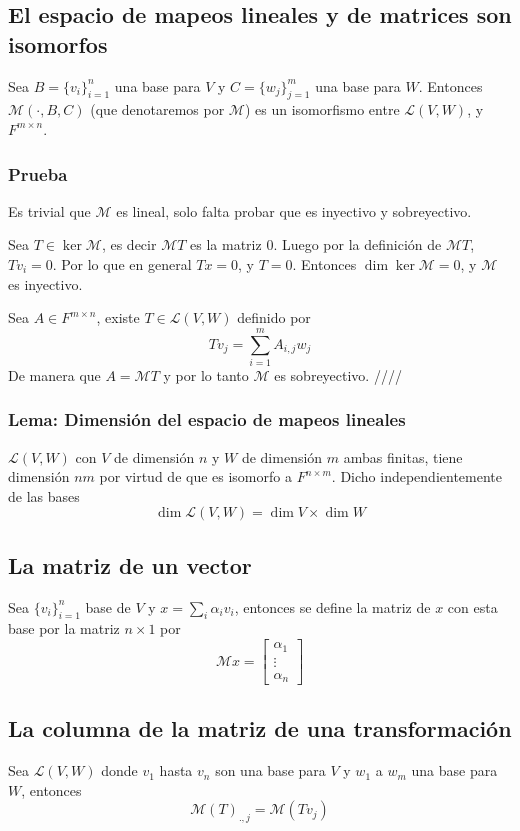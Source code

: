\documentclass{article}
\begin{document}
\subsection{El espacio de mapeos lineales y de matrices son isomorfos}
Sea $B=\{v_i\}_{i=1}^n$ una base para $V$ y $C=\{w_j\}_{j=1}^m$ una base
para $W$. Entonces $\mathcal{M}(\cdot, B, C)$ (que denotaremos por 
$\mathcal{M}$) es un isomorfismo
entre $\mathcal{L}(V,W)$, y $F^{m\times n}$.
\newcommand{\M}{\mathcal{M}}
\subsubsection*{Prueba}
Es trivial que $\M$ es lineal, solo falta probar que es inyectivo y 
sobreyectivo.

Sea $T\in\ker\M$, es decir $\M T$ es la matriz $0$. Luego por la
definición de $\M T$, $Tv_i = 0$. Por lo que en general $Tx=0$,
y $T=0$. Entonces $\dim\ker\M = 0$, y $\M$ es inyectivo.

Sea $A\in F^{m\times n}$, existe $T\in\mathcal{L}(V,W)$ definido
por $$Tv_j = \sum^m_{i=1}A_{i,j} w_j$$
De manera que $A=\M T$ y por lo tanto $\M$ es sobreyectivo.
\hfill ////

\subsubsection{Lema: Dimensión del espacio de mapeos lineales}
$\mathcal{L}(V,W)$ con $V$ de dimensión $n$ y $W$ de dimensión $m$
ambas finitas, tiene dimensión $nm$ por virtud de que es isomorfo a
$F^{n\times m}$. Dicho independientemente de las bases
$$\dim \mathcal{L}(V,W) = \dim V \times \dim W$$

\subsection{La matriz de un vector}
Sea $\{v_i\}_{i=1}^n$ base de $V$ y $x=\sum_i\alpha_i v_i$, 
entonces se define la matriz de $x$ con esta base por la matriz
$n\times 1$ por
$$\M x = \begin{bmatrix}
    \alpha_1 \\
    \vdots \\
    \alpha_n
\end{bmatrix}$$

\subsection{La columna de la matriz de una transformación}
Sea $\mathcal{L}(V,W)$ donde $v_1$ hasta $v_n$ son una base para $V$
y $w_1$ a $w_m$ una base para $W$, entonces
$$\M(T)_{.,j} = \M (Tv_j)$$
\end{document}
